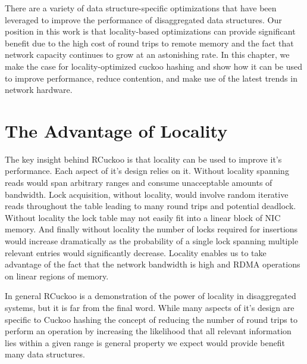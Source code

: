 \documentclass[12pt]{ucsddissertation}
\begin{document}
There are a variety of data structure-specific optimizations that have been leveraged to improve the
performance of disaggregated data structures.  Our position in this work is that locality-based
optimizations can provide significant benefit due to the high cost of round trips to remote memory
and the fact that network capacity continues to grow at an astonishing rate. In this chapter, we
make the case for locality-optimized cuckoo hashing and show how it can be used to improve
performance, reduce contention, and make use of the latest trends in network hardware.


% 
% 
% 
% 
% 
% 
%
% 



\section{The Advantage of Locality}

The key insight behind RCuckoo is that locality can be used to improve it's performance. Each aspect
of it's design relies on it. Without locality spanning reads would span arbitrary ranges and consume
unacceptable amounts of bandwidth. Lock acquisition, without locality, would involve random
iterative reads throughout the table leading to many round trips and potential deadlock. Without
locality the lock table may not easily fit into a linear block of NIC memory. And finally without
locality the number of locks required for insertions would increase dramatically as the probability
of a single lock spanning multiple relevant entries would significantly decrease. Locality enables
us to take advantage of the fact that the network bandwidth is high and RDMA operations on linear
regions of memory.

In general RCuckoo is a demonstration of the power of locality in disaggregated systems, but it is
far from the final word. While many aspects of it's design are specific to Cuckoo hashing the
concept of reducing the number of round trips to perform an operation by increasing the likelihood
that all relevant information lies within a given range is general property we expect would provide
benefit many data structures.
\end{document}
